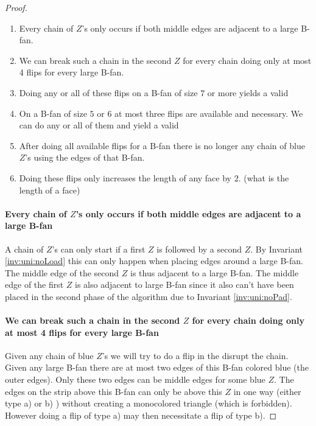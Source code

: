 \begin{proof}
  \begin{enumerate}
    \item Every chain of $Z$'s only occurs if both middle edges are adjacent to a large B-fan.
    \item We can break such a chain in the second $Z$ for every chain doing only at most 4 flips for every large B-fan.
    \item Doing any or all of these flips on a B-fan of size $7$ or more yields a valid \rel
    \item On a B-fan of size $5$ or $6$ at most three flips are available and necessary. We can do any or all of them and yield a valid \rel
    \item After doing all available flips for a B-fan there is no longer any chain of blue $Z$'s using the edges of that B-fan.
    \item Doing these flips only increases the length of any face by $2$. (what is the length of a face)
  \end{enumerate}

  \paragraph{Every chain of $Z$'s only occurs if both middle edges are adjacent to a large B-fan}
  A chain of $Z$'s can only start if a first $Z$ is followed by a second $Z$. By Invariant \ref{inv:uni:noLoad} this can only happen when placing edges around a large B-fan. The middle edge of the second $Z$ is thus adjacent to a large B-fan. The middle edge of the first $Z$ is also adjacent to large B-fan since it also can't have been placed in the second phase of the algorithm due to Invariant \ref{inv:uni:noPad}.

  \paragraph{We can break such a chain in the second $Z$ for every chain doing only at most 4 flips for every large B-fan}
  Given any chain of blue $Z$'s we will try to do a flip in the disrupt the chain. Given any large B-fan there are at most two edges of this B-fan colored blue (the outer edges). Only these two edges can be middle edges for some blue $Z$. The edges on the strip above this B-fan can only be above this $Z$ in one way (either type a) or b) ) without creating a monocolored triangle (which is forbidden). However doing a flip of type a) may then necessitate a flip of type b).


\end{proof}
